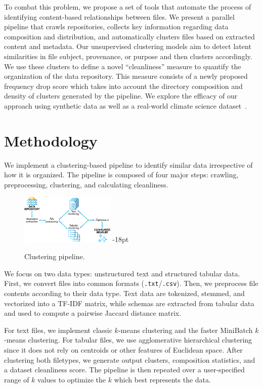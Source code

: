 \documentclass[sigconf,screen]{acmart}
\begin{document}
To combat this problem, we propose a set of tools that automate the process of identifying content-based relationships between files. We present a parallel pipeline that crawls repositories, collects key information regarding data composition and distribution, and automatically clusters files based on extracted content and metadata. Our unsupervised clustering models aim to detect latent similarities in file subject, provenance, or purpose \cite{brackenbury2018} and then clusters accordingly. We use these clusters to define a novel ``cleanliness'' measure to quantify the organization of the data repository. This measure consists of a newly proposed frequency drop score which takes into account the directory composition and density of clusters generated by the pipeline. We explore the efficacy of our approach using synthetic data as well as a real-world climate science dataset~\cite{CDIAC}. 

\section{Methodology}

We implement a clustering-based pipeline to identify similar data irrespective of how it is organized. The pipeline is composed of four major steps:  crawling, preprocessing, clustering, and calculating cleanliness.

\begin{center}
\begin{figure}[!htbp]
\includegraphics[width=0.4\textwidth]{pipeline.png}
\setlength{\belowcaptionskip}   {-18pt}
\caption{\label{pipeline} Clustering pipeline.}
\end{figure}
\end{center}

We focus on two data types: unstructured text and structured tabular data. 
First, we convert files into common formats (\texttt{.txt}/\texttt{.csv}). Then, we preprocess file contents according to their data type. Text data are tokenized, stemmed, and vectorized into a TF-IDF matrix, while schemas are extracted from tabular data and used to compute a pairwise Jaccard distance matrix.

For text files, we implement classic $k$-means clustering and the faster MiniBatch $k$-means clustering. For tabular files, we use agglomerative hierarchical clustering since
it does not rely on centroids or other features of Euclidean space. After clustering both filetypes, we generate output clusters, composition statistics, and a dataset cleanliness score. The pipeline is then repeated over a user-specified range of $k$ values to optimize the $k$ which best represents the data.
\end{document}
